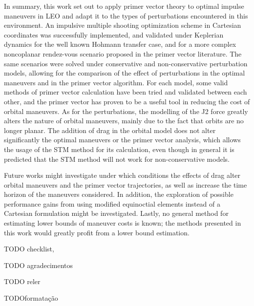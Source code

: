In summary, this work set out to apply primer vector theory to optimal impulse maneuvers in LEO and adapt it to the types of perturbations encountered in this environment. An impulsive multiple shooting optimization scheme in Cartesian coordinates was successfully implemented, and validated under Keplerian dynamics for the well known Hohmann transfer case, and for a more complex noncoplanar rendez-vous scenario proposed in the primer vector literature. The same scenarios were solved under conservative and non-conservative perturbation models, allowing for the comparison of the effect of perturbations in the optimal maneuvers and in the primer vector algorithm. For each model, some valid methods of primer vector calculation have been tried and validated between each other, and the primer vector has proven to be a useful tool in reducing the cost of orbital maneuvers. As for the perturbations, the modelling of the J2 force greatly alters the nature of orbital maneuvers, mainly due to the fact that orbits are no longer planar. The addition of drag in the orbital model does not alter significantly the optimal maneuvers or the primer vector analysis, which allows the usage of the STM method for its calculation, even though in general it is predicted that the STM method will not work for non-conservative models. 

Future works might investigate under which conditions the effects of drag alter orbital maneuvers and the primer vector trajectories, as well as increase the time horizon of the maneuvers considered. In addition, the exploration of possible performance gains from using modified equinoctial elements instead of a Cartesian formulation might be investigated. Lastly, no general method for estimating lower bounds of maneuver costs is known; the methods presented in this work would greatly profit from a lower bound estimation.

TODO checklist, 

TODO agradecimentos

TODO reler

TODOformatação